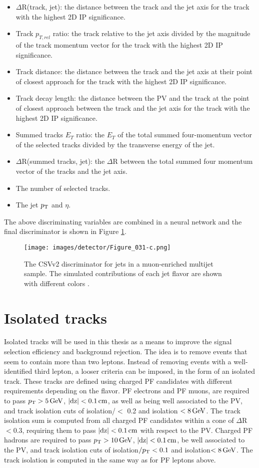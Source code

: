 \begin{itemize}
\item $\Delta$R(track, jet): the distance between the track and the jet axis for the track with the highest 2D IP significance.
\item Track $p_{T,rel}$ ratio: the track \pt relative to the jet axis divided by the magnitude of the track momentum vector for the track with the highest 2D IP significance.
\item Track distance: the distance between the track and the jet axis at their point of closest approach for the track with the highest 2D IP significance.
\item Track decay length: the distance between the PV and the track at the point of closest approach between the track and the jet axis for the track with the highest 2D IP significance.
\item Summed tracks $E_T$ ratio: the $E_T$ of the total summed four-momentum vector of the selected tracks divided by the transverse energy of the jet.
\item $\Delta$R(summed tracks, jet): the $\Delta$R between the total summed four momentum vector of the tracks and the jet axis.
\item The number of selected tracks.
\item The jet $p_{\mathrm{T}}$ and $\eta$.
\end{itemize}
The above discriminating variables are combined in a neural network and the final discriminator is shown in Figure \ref{fig:CSVv2}.
\begin{figure}[!h]
\centering
\texttt{[image: images/detector/Figure\_031-c.png]}\\
\caption{The CSVv2 discriminator for jets in a muon-enriched multijet sample. The simulated contributions of each jet flavor are shown with different colors \cite{Sirunyan:2017ezt}.}
\label{fig:CSVv2}
\end{figure}
\section{Isolated tracks}\label{sec:isotracks}
\noindent
\justify
Isolated tracks will be used in this thesis as a means to improve the signal selection efficiency and background rejection. 
The idea is to remove events that seem to contain more than two leptons. 
Instead of removing events with a well-identified third lepton, a looser criteria can be imposed, in the form of an isolated track.
These tracks are defined using charged PF candidates with different requirements depending on the flavor. 
PF electrons and PF muons, are required to pass $p_{\mathrm{T}}>5\,\text{Ge\hspace{-.08em}V}$, $|\mathrm{dz}|<0.1\,\text{cm}$, as well as being well associated to the PV, and track isolation cuts of isolation/\pt $<$ 0.2 and isolation $<8\,\text{Ge\hspace{-.08em}V}$. 
The track isolation sum is computed from all charged PF candidates within a cone of $\Delta$R$<0.3$, requiring them to pass $|\mathrm{dz}|<0.1\,\text{cm}$ with respect to the PV. 
Charged PF hadrons are required to pass $p_{\mathrm{T}}>10\,\text{Ge\hspace{-.08em}V}$, $|\mathrm{dz}|<0.1\,\text{cm}$, be well associated to the PV, and track isolation cuts of isolation$/p_{\mathrm{T}}<0.1$ and isolation$<8\,\text{Ge\hspace{-.08em}V}$. 
The track isolation is computed in the same way as for PF leptons above.

